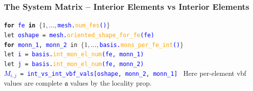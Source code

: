 \documentclass[compress]{beamer}
\begin{document}
\begin{frame}
  \frametitle{The System Matrix -- Interior Elements vs Interior Elements}
  \vspace{-.2cm}
  \texttt{\textbf{for} \textcolor{blue}{fe} \textbf{in} $\{1,\dots,$\textcolor{blue}{mesh.\textcolor{orange}{num\_fes}()}$\}$\\
    \hspace{0.2cm} let \textcolor{blue}{oshape} = \textcolor{blue}{mesh.\textcolor{orange}{oriented\_shape\_for\_fe}(fe)}\\
    \hspace{0.2cm} \textbf{for} \textcolor{blue}{monn\_1}, \textcolor{blue}{monn\_2} in
                        $\{1,\dots,$\textcolor{blue}{basis.\textcolor{orange}{mons\_per\_fe\_int}()}$\}$\\
    \hspace{0.6cm}  let \textcolor{blue}{i} = \textcolor{blue}{basis.\textcolor{orange}{int\_mon\_el\_num}(fe, monn\_1)}\\
    \hspace{0.6cm}  let \textcolor{blue}{j} = \textcolor{blue}{basis.\textcolor{orange}{int\_mon\_el\_num}(fe, monn\_2)}\\
    \hspace{0.6cm}  \textcolor{blue}{$M_{i,j}$} = \textcolor{blue}{int\_vs\_int\_vbf\_vals[oshape, monn\_2, monn\_1]}
  }
  \pause
  Here per-element vbf values are complete $\mathfrak{a}$ values by the locality prop.
\end{frame}
\end{document}
